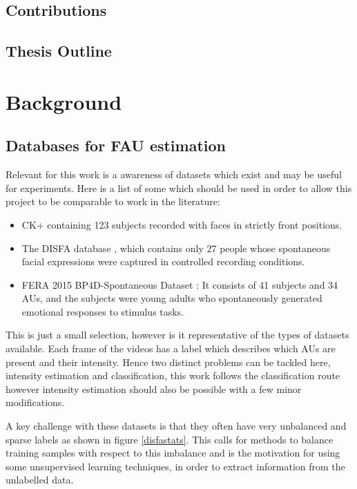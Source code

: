 \documentclass[11pt,twoside]{report}
\begin{document}
\section{Contributions}
\section{Thesis Outline}
\chapter{Background}

\section{Databases for FAU estimation}
Relevant for this work is a awareness of datasets which exist and may be useful
for experiments. Here is a list of some which should be used in order to allow
this project to be comparable to work in the literature:

\begin{itemize}
    \item CK+ \cite{Lucey2010} containing 123 subjects recorded with faces in strictly front positions.
    \item The DISFA database \cite{disfa}, which contains only 27 people whose spontaneous
          facial expressions were captured in controlled recording conditions.
    \item FERA 2015 BP4D-Spontaneous Dataset \cite{Valstar}:
          It consists of 41 subjects and 34 AUs, and the subjects were young adults who
          spontaneously generated emotional responses to stimulus tasks.
\end{itemize}

This is just a small selection, however is it representative of the types of
datasets available. Each frame of the videos has a label which describes which AUs are
present and their intensity. Hence two distinct problems can be tackled here, intensity
estimation and classification, this work follows the classification route however
intensity estimation should also be possible with a few minor modifications.

A key challenge with these datasets is that they often have very unbalanced and
sparse labels as shown in figure \ref{disfastats}. This calls for methods
to balance training samples with respect to this imbalance and is the
motivation for using some unsupervised learning techniques, in order to extract information
from the unlabelled data.
\end{document}
